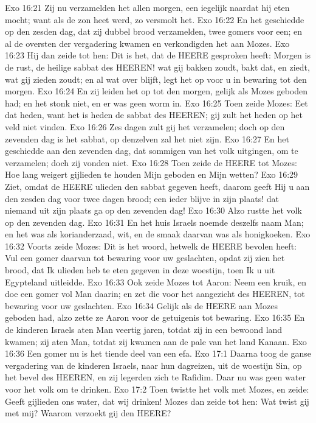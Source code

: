 Exo 16:21  Zij nu verzamelden het allen morgen, een iegelijk naardat hij eten mocht; want als de zon heet werd, zo versmolt het.
Exo 16:22  En het geschiedde op den zesden dag, dat zij dubbel brood verzamelden, twee gomers voor een; en al de oversten der vergadering kwamen en verkondigden het aan Mozes.
Exo 16:23  Hij dan zeide tot hen: Dit is het, dat de HEERE gesproken heeft: Morgen is de rust, de heilige sabbat des HEEREN! wat gij bakken zoudt, bakt dat, en ziedt, wat gij zieden zoudt; en al wat over blijft, legt het op voor u in bewaring tot den morgen.
Exo 16:24  En zij leiden het op tot den morgen, gelijk als Mozes geboden had; en het stonk niet, en er was geen worm in.
Exo 16:25  Toen zeide Mozes: Eet dat heden, want het is heden de sabbat des HEEREN; gij zult het heden op het veld niet vinden.
Exo 16:26  Zes dagen zult gij het verzamelen; doch op den zevenden dag is het sabbat, op denzelven zal het niet zijn.
Exo 16:27  En het geschiedde aan den zevenden dag, dat sommigen van het volk uitgingen, om te verzamelen; doch zij vonden niet.
Exo 16:28  Toen zeide de HEERE tot Mozes: Hoe lang weigert gijlieden te houden Mijn geboden en Mijn wetten?
Exo 16:29  Ziet, omdat de HEERE ulieden den sabbat gegeven heeft, daarom geeft Hij u aan den zesden dag voor twee dagen brood; een ieder blijve in zijn plaats! dat niemand uit zijn plaats ga op den zevenden dag!
Exo 16:30  Alzo rustte het volk op den zevenden dag.
Exo 16:31  En het huis Israels noemde deszelfs naam Man; en het was als korianderzaad, wit, en de smaak daarvan was als honigkoeken.
Exo 16:32  Voorts zeide Mozes: Dit is het woord, hetwelk de HEERE bevolen heeft: Vul een gomer daarvan tot bewaring voor uw geslachten, opdat zij zien het brood, dat Ik ulieden heb te eten gegeven in deze woestijn, toen Ik u uit Egypteland uitleidde.
Exo 16:33  Ook zeide Mozes tot Aaron: Neem een kruik, en doe een gomer vol Man daarin; en zet die voor het aangezicht des HEEREN, tot bewaring voor uw geslachten.
Exo 16:34  Gelijk als de HEERE aan Mozes geboden had, alzo zette ze Aaron voor de getuigenis tot bewaring.
Exo 16:35  En de kinderen Israels aten Man veertig jaren, totdat zij in een bewoond land kwamen; zij aten Man, totdat zij kwamen aan de pale van het land Kanaan.
Exo 16:36  Een gomer nu is het tiende deel van een efa.
Exo 17:1  Daarna toog de ganse vergadering van de kinderen Israels, naar hun dagreizen, uit de woestijn Sin, op het bevel des HEEREN, en zij legerden zich te Rafidim. Daar nu was geen water voor het volk om te drinken.
Exo 17:2  Toen twistte het volk met Mozes, en zeide: Geeft gijlieden ons water, dat wij drinken! Mozes dan zeide tot hen: Wat twist gij met mij? Waarom verzoekt gij den HEERE?
